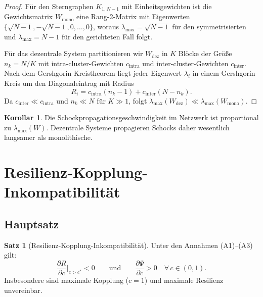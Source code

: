 ﻿\documentclass[a4paper,12pt]{article}
\theoremstyle{definition}
\newtheorem{satz}{Satz}
\newtheorem{korollar}{Korollar}
\begin{document}
\begin{proof}
    Für den Sterngraphen $K_{1,N-1}$ mit Einheitsgewichten ist die Gewichtsmatrix
    $W_{\text{mono}}$ eine Rang-2-Matrix mit Eigenwerten
    $\{\sqrt{N-1}, -\sqrt{N-1}, 0, \ldots, 0\}$, woraus $\lambda_{\max} = \sqrt{N-1}$
    für den symmetrisierten und $\lambda_{\max} = N-1$ für den gerichteten Fall folgt.
    
    Für das dezentrale System partitionieren wir $W_{\text{dez}}$ in $K$ Blöcke der Größe
    $n_k = N/K$ mit intra-cluster-Gewichten $c_{\text{intra}}$ und inter-cluster-Gewichten
    $c_{\text{inter}}$. Nach dem Gershgorin-Kreistheorem liegt jeder Eigenwert $\lambda_i$
    in einem Gershgorin-Kreis um den Diagonaleintrag mit Radius
    \[
        R_i = c_{\text{intra}}(n_k - 1) + c_{\text{inter}}(N - n_k).
    \]
    Da $c_{\text{inter}} \ll c_{\text{intra}}$ und $n_k \ll N$ für $K \gg 1$, folgt
    $\lambda_{\max}(W_{\text{dez}}) \ll \lambda_{\max}(W_{\text{mono}})$.
\end{proof}

\begin{korollar}
    Die Schockpropagationsgeschwindigkeit im Netzwerk ist proportional zu
    $\lambda_{\max}(W)$. Dezentrale Systeme propagieren Schocks daher wesentlich
    langsamer als monolithische.
\end{korollar}

\section{Resilienz-Kopplung-Inkompatibilität}

\subsection{Hauptsatz}

\begin{satz}[Resilienz-Kopplung-Inkompatibilität]
\label{satz:rki}
    Unter den Annahmen (A1)--(A3) gilt:
    \[
        \frac{\partial R}{\partial c}\bigg|_{c > c^*} < 0
        \qquad\text{und}\qquad
        \frac{\partial \Psi}{\partial c} > 0 \quad \forall\, c \in (0,1).
    \]
    Insbesondere sind maximale Kopplung ($c = 1$) und maximale Resilienz unvereinbar.
\end{satz}
\end{document}
